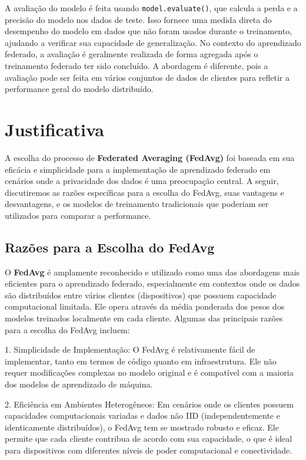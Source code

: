 A avaliação do modelo é feita usando \texttt{model.evaluate()}, que calcula a perda e a precisão do modelo nos dados de teste. Isso fornece uma medida direta do desempenho do modelo em dados que não foram usados durante o treinamento, ajudando a verificar sua capacidade de generalização. No contexto do aprendizado federado, a avaliação é geralmente realizada de forma agregada após o treinamento federado ter sido concluído. A abordagem é diferente, pois a avaliação pode ser feita em vários conjuntos de dados de clientes para refletir a performance geral do modelo distribuído.

\section{Justificativa}

A escolha do processo de \textbf{Federated Averaging (FedAvg)} foi baseada em sua eficácia e simplicidade para a implementação de aprendizado federado em cenários onde a privacidade dos dados é uma preocupação central. A seguir, discutiremos as razões específicas para a escolha do FedAvg, suas vantagens e desvantagens, e os modelos de treinamento tradicionais que poderiam ser utilizados para comparar a performance.

\subsection{Razões para a Escolha do FedAvg}

O \textbf{FedAvg} é amplamente reconhecido e utilizado como uma das abordagens mais eficientes para o aprendizado federado, especialmente em contextos onde os dados são distribuídos entre vários clientes (dispositivos) que possuem capacidade computacional limitada. Ele opera através da média ponderada dos pesos dos modelos treinados localmente em cada cliente. Algumas das principais razões para a escolha do FedAvg incluem:

1. Simplicidade de Implementação: O FedAvg é relativamente fácil de implementar, tanto em termos de código quanto em infraestrutura. Ele não requer modificações complexas no modelo original e é compatível com a maioria dos modelos de aprendizado de máquina.

2. Eficiência em Ambientes Heterogêneos: Em cenários onde os clientes possuem capacidades computacionais variadas e dados não IID (independentemente e identicamente distribuídos), o FedAvg tem se mostrado robusto e eficaz. Ele permite que cada cliente contribua de acordo com sua capacidade, o que é ideal para dispositivos com diferentes níveis de poder computacional e conectividade.

